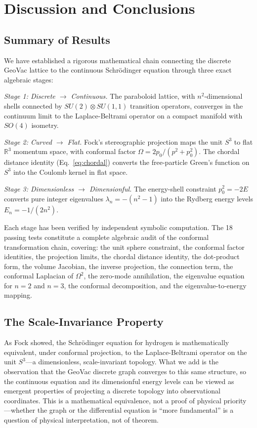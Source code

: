 \documentclass[aps,pra,twocolumn,superscriptaddress,longbibliography]{revtex4-2}
\begin{document}
\section{Discussion and Conclusions}
\label{sec:discussion}

\subsection{Summary of Results}

We have established a rigorous mathematical chain connecting the discrete GeoVac lattice to the continuous Schr\"odinger equation through three exact algebraic stages:

\textit{Stage 1: Discrete $\to$ Continuous.} The paraboloid lattice, with $n^2$-dimensional shells connected by $SU(2) \otimes SU(1,1)$ transition operators, converges in the continuum limit to the Laplace-Beltrami operator on a compact manifold with $SO(4)$ isometry.

\textit{Stage 2: Curved $\to$ Flat.} Fock's stereographic projection maps the unit $S^3$ to flat $\mathbb{R}^3$ momentum space, with conformal factor $\Omega = 2p_0/(p^2 + p_0^2)$. The chordal distance identity (Eq.~\ref{eq:chordal}) converts the free-particle Green's function on $S^3$ into the Coulomb kernel in flat space.

\textit{Stage 3: Dimensionless $\to$ Dimensionful.} The energy-shell constraint $p_0^2 = -2E$ converts pure integer eigenvalues $\lambda_n = -(n^2 - 1)$ into the Rydberg energy levels $E_n = -1/(2n^2)$.

Each stage has been verified by independent symbolic computation. The 18 passing tests constitute a complete algebraic audit of the conformal transformation chain, covering: the unit sphere constraint, the conformal factor identities, the projection limits, the chordal distance identity, the dot-product form, the volume Jacobian, the inverse projection, the connection term, the conformal Laplacian of $\Omega^2$, the zero-mode annihilation, the eigenvalue equation for $n = 2$ and $n = 3$, the conformal decomposition, and the eigenvalue-to-energy mapping.

\subsection{The Scale-Invariance Property}

As Fock showed, the Schr\"odinger equation for hydrogen is mathematically equivalent, under conformal projection, to the Laplace-Beltrami operator on the unit $S^3$---a dimensionless, scale-invariant topology. What we add is the observation that the GeoVac discrete graph converges to this same structure, so the continuous equation and its dimensionful energy levels can be viewed as emergent properties of projecting a discrete topology into observational coordinates. This is a mathematical equivalence, not a proof of physical priority---whether the graph or the differential equation is ``more fundamental'' is a question of physical interpretation, not of theorem.
\end{document}
